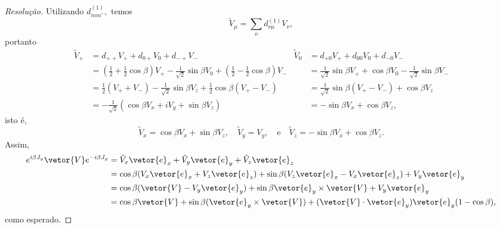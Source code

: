 \begin{proof}[Resolução]
    Utilizando \(d_{mm'}^{(1)},\) temos
    \begin{equation*}
        \tilde{V}_{\mu} = \sum_{\nu} d^{(1)}_{\nu\mu} V_{\nu},
    \end{equation*}
    portanto
    \begin{align*}
        \tilde{V}_+ &= d_{++} V_+ + d_{0+} V_0 + d_{-+} V_-&
        \tilde{V}_0 &= d_{+0} V_+ + d_{00} V_0 + d_{-0} V_-\\
                    &= \left(\frac12 + \frac12 \cos \beta\right) V_+ - \frac{1}{\sqrt{2}} \sin\beta V_0 + \left(\frac12 - \frac12 \cos\beta\right) V_-&
                    &= \frac1{\sqrt{2}} \sin\beta V_+ + \cos\beta V_0 - \frac{1}{\sqrt{2}} \sin\beta V_-\\
                    &= \frac12 (V_+ + V_-) - \frac1{\sqrt{2}} \sin\beta V_z + \frac12 \cos\beta (V_+ - V_-)&
                    &= \frac{1}{\sqrt{2}}\sin\beta (V_+ - V_-) + \cos\beta V_z\\
                    &= - \frac{1}{\sqrt{2}} \left(\cos\beta V_x + i V_y + \sin\beta V_z\right)&
                    &= - \sin\beta V_x + \cos\beta V_z,
    \end{align*}
    isto é,
    \begin{equation*}
        \tilde{V}_x = \cos\beta V_x + \sin\beta V_z,\quad
        \tilde{V}_y = V_y,\quad\text{e}\quad
        \tilde{V}_z = -\sin\beta V_x + \cos\beta V_z.
    \end{equation*}
    Assim,
    \begin{align*}
        e^{i\beta J_y} \vetor{V} e^{-i\beta J_y} &= \tilde{V}_x \vetor{e}_x + \tilde{V}_y \vetor{e}_y + \tilde{V}_z \vetor{e}_z\\
                                                 &= \cos\beta (V_x \vetor{e}_x + V_z \vetor{e}_z) + \sin\beta (V_z \vetor{e}_x - V_x \vetor{e}_z) + V_y \vetor{e}_y\\
                                                 &= \cos\beta (\vetor{V} - V_y \vetor{e}_y) + \sin\beta \vetor{e}_y \times \vetor{V} + V_y \vetor{e}_y\\
                                                 &= \cos\beta \vetor{V} + \sin\beta (\vetor{e}_y \times \vetor{V}) + (\vetor{V} \cdot \vetor{e}_y)\vetor{e}_y (1 - \cos\beta),
    \end{align*}
    como esperado.
\end{proof}
